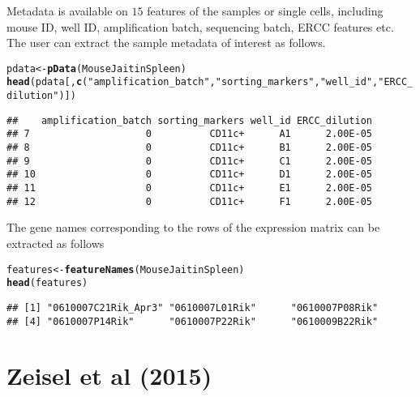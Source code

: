 \documentclass[12pt]{article}\usepackage[]{graphicx}\usepackage[usenames,dvipsnames]{color}
\makeatletter
\newcommand{\hlstr}[1]{\textcolor[rgb]{0.192,0.494,0.8}{#1}}%
\newcommand{\hlstd}[1]{\textcolor[rgb]{0.345,0.345,0.345}{#1}}%
\newcommand{\hlkwb}[1]{\textcolor[rgb]{0.69,0.353,0.396}{#1}}%
\newcommand{\hlkwd}[1]{\textcolor[rgb]{0.737,0.353,0.396}{\textbf{#1}}}%
\newenvironment{kframe}{%
 \def\at@end@of@kframe{}%
 \ifinner\ifhmode%
  \def\at@end@of@kframe{\end{minipage}}%
  \begin{minipage}{\columnwidth}%
 \fi\fi%
 \def\FrameCommand##1{\hskip\@totalleftmargin \hskip-\fboxsep
 \colorbox{shadecolor}{##1}\hskip-\fboxsep
     \hskip-\linewidth \hskip-\@totalleftmargin \hskip\columnwidth}%
 \MakeFramed {\advance\hsize-\width
   \@totalleftmargin\z@ \linewidth\hsize
   \@setminipage}}%
 {\par\unskip\endMakeFramed%
 \at@end@of@kframe}
\newenvironment{knitrout}{}{} %
\makeatother
\begin{document}
Metadata is available on $15$ features of the samples or single cells,
including mouse ID, well ID, amplification batch, sequencing batch,
ERCC features etc. The user can extract the sample metadata of interest as follows.

\begin{knitrout}
\color{fgcolor}\begin{kframe}
\begin{alltt}
\hlstd{pdata} \hlkwb{<-} \hlkwd{pData}\hlstd{(MouseJaitinSpleen)}
\hlkwd{head}\hlstd{(pdata[,}\hlkwd{c}\hlstd{(}\hlstr{"amplification_batch"}\hlstd{,}\hlstr{"sorting_markers"}\hlstd{,}\hlstr{"well_id"}\hlstd{,}\hlstr{"ERCC_dilution"}\hlstd{)])}
\end{alltt}
\begin{verbatim}
##    amplification_batch sorting_markers well_id ERCC_dilution
## 7                    0          CD11c+      A1      2.00E-05
## 8                    0          CD11c+      B1      2.00E-05
## 9                    0          CD11c+      C1      2.00E-05
## 10                   0          CD11c+      D1      2.00E-05
## 11                   0          CD11c+      E1      2.00E-05
## 12                   0          CD11c+      F1      2.00E-05
\end{verbatim}
\end{kframe}
\end{knitrout}

The gene names corresponding to the rows of the expression matrix can be extracted
as follows

\begin{knitrout}
\color{fgcolor}\begin{kframe}
\begin{alltt}
\hlstd{features} \hlkwb{<-} \hlkwd{featureNames}\hlstd{(MouseJaitinSpleen)}
\hlkwd{head}\hlstd{(features)}
\end{alltt}
\begin{verbatim}
## [1] "0610007C21Rik_Apr3" "0610007L01Rik"      "0610007P08Rik"     
## [4] "0610007P14Rik"      "0610007P22Rik"      "0610009B22Rik"
\end{verbatim}
\end{kframe}
\end{knitrout}


\section{Zeisel et al (2015)}
\end{document}
